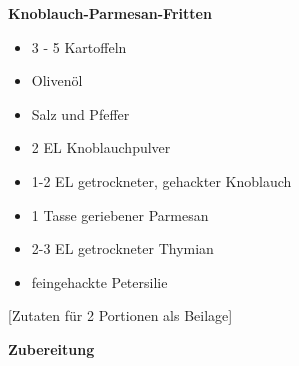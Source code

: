 

\parindent0pt	

\pagestyle{empty}


\textbf{{\LARGE Knoblauch-Parmesan-Fritten}}%

\hrulefill

\vspace*{1.5cm}
\begin{multicols}{2}	


\begin{itemize}
\item 3 - 5 Kartoffeln
\item Olivenöl
\item Salz und Pfeffer	
\item 2 EL Knoblauchpulver
\item 1-2 EL getrockneter, gehackter Knoblauch
\item 1 Tasse geriebener Parmesan
\item 2-3 EL getrockneter Thymian
\item feingehackte Petersilie
\end{itemize}
\end{multicols}
\vfill									%

\vspace{1cm}
%
\begin{center}
%
[Zutaten für 2 Portionen als Beilage]%
\end{center}


\vfill
\newpage
\textbf{{\LARGE Zubereitung}}%

\hrulefill

